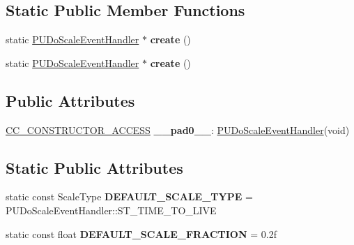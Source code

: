 \subsection*{Static Public Member Functions}
\begin{DoxyCompactItemize}
\item 
\mbox{\label{classPUDoScaleEventHandler_a5cf8de59980356bf48e63d8bbbc62a10}} 
static \hyperlink{classPUDoScaleEventHandler}{P\+U\+Do\+Scale\+Event\+Handler} $\ast$ {\bfseries create} ()
\item 
\mbox{\label{classPUDoScaleEventHandler_a86c8958f04da8325b9c12dc9abfdcdf2}} 
static \hyperlink{classPUDoScaleEventHandler}{P\+U\+Do\+Scale\+Event\+Handler} $\ast$ {\bfseries create} ()
\end{DoxyCompactItemize}
\subsection*{Public Attributes}
\begin{DoxyCompactItemize}
\item 
\mbox{\label{classPUDoScaleEventHandler_a3a27892d9e77e95204517c189936f026}} 
\hyperlink{_2cocos2d_2cocos_2base_2ccConfig_8h_a25ef1314f97c35a2ed3d029b0ead6da0}{C\+C\+\_\+\+C\+O\+N\+S\+T\+R\+U\+C\+T\+O\+R\+\_\+\+A\+C\+C\+E\+SS} {\bfseries \+\_\+\+\_\+pad0\+\_\+\+\_\+}\+: \hyperlink{classPUDoScaleEventHandler}{P\+U\+Do\+Scale\+Event\+Handler}(void)
\end{DoxyCompactItemize}
\subsection*{Static Public Attributes}
\begin{DoxyCompactItemize}
\item 
\mbox{\label{classPUDoScaleEventHandler_a21905da2482bda0d14bfa438853317e7}} 
static const Scale\+Type {\bfseries D\+E\+F\+A\+U\+L\+T\+\_\+\+S\+C\+A\+L\+E\+\_\+\+T\+Y\+PE} = P\+U\+Do\+Scale\+Event\+Handler\+::\+S\+T\+\_\+\+T\+I\+M\+E\+\_\+\+T\+O\+\_\+\+L\+I\+VE
\item 
\mbox{\label{classPUDoScaleEventHandler_aa2209501a1053f30653f5c24770d6642}} 
static const float {\bfseries D\+E\+F\+A\+U\+L\+T\+\_\+\+S\+C\+A\+L\+E\+\_\+\+F\+R\+A\+C\+T\+I\+ON} = 0.\+2f
\end{DoxyCompactItemize}
